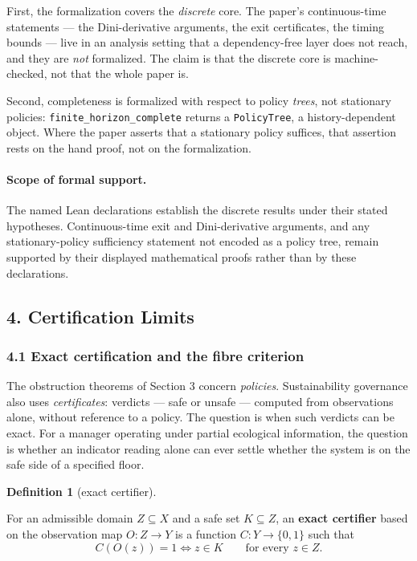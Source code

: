 \documentclass[10pt,twocolumn]{article}
\theoremstyle{definition}
\newtheorem{definition}{Definition}
\begin{document}
First, the formalization covers the \emph{discrete} core. The paper's continuous-time
statements --- the Dini-derivative arguments, the exit certificates, the timing bounds
--- live in an analysis setting that a dependency-free layer does not reach, and they are
\emph{not} formalized. The claim is that the discrete core is machine-checked, not that
the whole paper is.

Second, completeness is formalized with respect to policy \emph{trees}, not stationary
policies: \texttt{finite\_horizon\_complete} returns a \texttt{PolicyTree}, a
history-dependent object. Where the paper asserts that a stationary policy suffices,
that assertion rests on the hand proof, not on the formalization.

\paragraph{Scope of formal support.} The named Lean declarations establish the
discrete results under their stated hypotheses. Continuous-time exit and Dini-derivative
arguments, and any stationary-policy sufficiency statement not encoded as a policy tree,
remain supported by their displayed mathematical proofs rather than by these declarations.

\subsection{4. Certification Limits}\label{calc-certification-limits}

\subsubsection{4.1 Exact certification and the fibre
criterion}\label{calc-exact-certification-and-the-fibre-criterion}

The obstruction theorems of Section 3 concern \emph{policies}.
Sustainability governance also uses \emph{certificates}: verdicts
--- safe or unsafe --- computed from observations alone, without
reference to a policy. The question is when such verdicts can be exact.
For a manager operating under partial ecological information, the question is whether an indicator reading alone can ever settle whether the system is on the safe side of a specified floor.

\begin{definition}[exact certifier]\label{calc-def:certifier}

For an admissible domain
\(Z \subseteq X\) and a safe set \(K \subseteq Z\), an \textbf{exact
certifier} based on the observation map \(O : Z \to Y\) is a function
\(C : Y \to \{0,1\}\) such that
\[C(O(z)) = 1 \iff z \in K \qquad \text{for every } z \in Z.\]

\end{definition}
\end{document}
